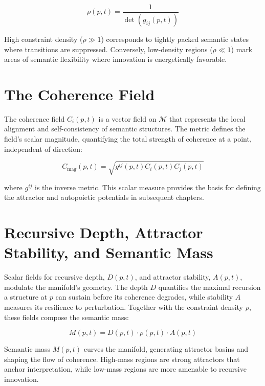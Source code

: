 \begin{equation}
\rho(p, t) = \frac{1}{\det(g_{ij}(p, t))}
\end{equation}

High constraint density (\(\rho \gg 1\)) corresponds to tightly packed semantic states where transitions are suppressed. Conversely, low-density regions (\(\rho \ll 1\)) mark areas of semantic flexibility where innovation is energetically favorable.


\section{The Coherence Field}
\label{sec:the_coherence_field}

The coherence field \(C_i(p, t)\) is a vector field on \(\mathcal{M}\) that represents the local alignment and self-consistency of semantic structures. The metric defines the field's scalar magnitude, quantifying the total strength of coherence at a point, independent of direction:

\begin{equation}
C_{\mathrm{mag}}(p, t) = \sqrt{g^{ij}(p, t) C_i(p, t) C_j(p, t)}
\end{equation}

where \(g^{ij}\) is the inverse metric. This scalar measure provides the basis for defining the attractor and autopoietic potentials in subsequent chapters.


\section{Recursive Depth, Attractor Stability, and Semantic Mass}
\label{sec:recursive_depth_attractor_stability_and_semantic_mass}

Scalar fields for recursive depth, \(D(p, t)\), and attractor stability, \(A(p, t)\), modulate the manifold's geometry. The depth \(D\) quantifies the maximal recursion a structure at \(p\) can sustain before its coherence degrades, while stability \(A\) measures its resilience to perturbation. Together with the constraint density \(\rho\), these fields compose the semantic mass:

\begin{equation}
M(p, t) = D(p, t) \cdot \rho(p, t) \cdot A(p, t)
\end{equation}

Semantic mass \(M(p,t)\) curves the manifold, generating attractor basins and shaping the flow of coherence. High-mass regions are strong attractors that anchor interpretation, while low-mass regions are more amenable to recursive innovation. 